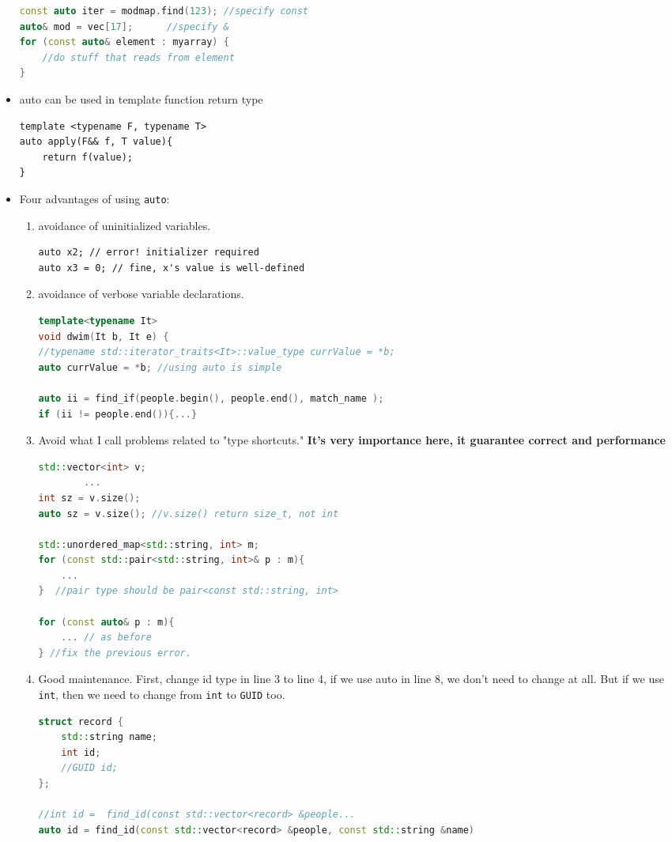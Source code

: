 \documentclass[a4paper,11pt,twoside]{book}
\begin{document}
\begin{itemize}
\begin{lstlisting}[frame=single, language=c++]
const auto iter = modmap.find(123); //specify const
auto& mod = vec[17];      //specify &
for (const auto& element : myarray) {
	//do stuff that reads from element
}
\end{lstlisting}
	
	\item auto can be used in template function return type
\begin{lstlisting}
template <typename F, typename T>
auto apply(F&& f, T value){
	return f(value);
}
\end{lstlisting}

	\item Four advantages of using \texttt{auto}:
	\begin{enumerate}
		\item avoidance of uninitialized variables.
\begin{lstlisting}[numbers=none]
auto x2; // error! initializer required
auto x3 = 0; // fine, x's value is well-defined
\end{lstlisting}

		\item avoidance of verbose variable declarations.
\begin{lstlisting}[frame=single, language=c++]
template<typename It>
void dwim(It b, It e) {
//typename std::iterator_traits<It>::value_type currValue = *b;
auto currValue = *b; //using auto is simple
	
auto ii = find_if(people.begin(), people.end(), match_name );               
if (ii != people.end()){...}
\end{lstlisting}

		\item Avoid what I call problems related to "type shortcuts." \textbf{It's very importance here, it guarantee correct and performance}
\begin{lstlisting}[frame=single, language=c++]
std::vector<int> v;
		...
int sz = v.size(); 
auto sz = v.size(); //v.size() return size_t, not int
		
std::unordered_map<std::string, int> m;
for (const std::pair<std::string, int>& p : m){
	... 
}  //pair type should be pair<const std::string, int>

for (const auto& p : m){
	... // as before
} //fix the previous error.
\end{lstlisting}

	\item Good maintenance. First, change id type in line 3 to line 4, if we use auto in line 8, we don't need to change at all. But if we use \texttt{int}, then we need to change from \texttt{int} to \texttt{GUID} too.
\begin{lstlisting}[frame=single, language=c++, mathescape=true]
struct record {
	std::string name;
	int id;
	//GUID id; 
};

//int id =  find_id(const std::vector<record> &people...
auto id = find_id(const std::vector<record> &people, const std::string &name)
\end{lstlisting}
	\end{enumerate}
\end{itemize}
	
\end{document}
